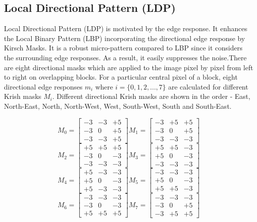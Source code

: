 \documentclass[conference]{IEEEtran}
\begin{document}
\subsection{Local Directional Pattern (LDP)}
Local Directional Pattern (LDP) \cite{2010LDP} is motivated by the edge response. It enhances the Local Binary Pattern (LBP) \cite{2002LBP} incorporating the directional edge response by Kirsch Masks. It is a robust micro-pattern compared to LBP \cite{2002LBP} since it considers the surrounding edge responses. As a result, it easily suppresses the noise.There are eight directional masks which are applied to the image pixel by pixel from left to right on overlapping blocks. For a particular central pixel of a block, eight directional edge responses $m_i$ where $i = \{0, 1, 2,...,7\}$ are calculated for different Krish masks $M_i$. Different directional Krish masks are shown in the order - East, North-East, North, North-West, West, South-West, South and South-East.
\begin{center}
	\[
	M_0 = 
	\begin{bmatrix}
	-3 & -3 & +5 \\
	-3 & 0 & +5 \\
	-3 & -3 & +5
	\end{bmatrix}
	M_1 = 
	\begin{bmatrix}
	-3 & +5 & +5 \\
	-3 & 0 & +5 \\
	-3 & -3 & -3
	\end{bmatrix}
	\]
	\[
	M_2 = 
	\begin{bmatrix}
	+5 & +5 & +5 \\
	-3 & 0 & -3 \\
	-3 & -3 & -3
	\end{bmatrix}
	M_3 = 
	\begin{bmatrix}
	+5 & +5 & -3 \\
	+5 & 0 & -3 \\
	-3 & -3 & -3
	\end{bmatrix}
	\]
	\[
	M_4 = 
	\begin{bmatrix}
	+5 & -3 & -3 \\
	+5 & 0 & -3 \\
	+5 & -3 & -3
	\end{bmatrix}
	M_5 = 
	\begin{bmatrix}
	-3 & -3 & -3 \\
	+5 & 0 & -3 \\
	+5 & +5 & -3
	\end{bmatrix}
	\]
	\[
	M_6 = 
	\begin{bmatrix}
	-3 & -3 & -3 \\
	-3 & 0 & -3 \\
	+5 & +5 & +5
	\end{bmatrix}
	M_7 = 
	\begin{bmatrix}
	-3 & -3 & -3 \\
	-3 & 0 & +5 \\
	-3 & +5 & +5
	\end{bmatrix}
	\]
	
\end{center}
\end{document}
